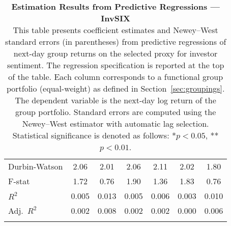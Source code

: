 \begin{table}[ht]
\begin{tabular}{l *{6}{c}}
Durbin-Watson & 2.06 & 2.01 & 2.06 & 2.11 & 2.02 & 1.80 \\
F-stat & 1.72 & 0.76 & 1.90 & 1.36 & 1.83 & 0.76 \\
\(R^2\) & 0.005 & 0.013 & 0.005 & 0.006 & 0.003 & 0.010 \\
Adj.\ \(R^2\) & 0.002 & 0.008 & 0.002 & 0.002 & 0.000 & 0.006 \\
\addlinespace
\midrule
\multicolumn{7}{c}{Specification tested: $R_{g,t+1} = \alpha_g + \beta_{sent,g} S_t + \phi R_{g,t} + \theta B_{g,t} + \gamma M_t + \varepsilon_{g,t+1}$}\\
\bottomrule
\end{tabular}
\caption{\textbf{Estimation Results from Predictive Regressions — InvSIX} \\
This table presents coefficient estimates and Newey--West standard errors (in parentheses) from predictive regressions of next-day group returns on the selected proxy for investor sentiment.
The regression specification is reported at the top of the table. Each column corresponds to a functional group portfolio (equal-weight) as defined in Section~\ref{sec:groupings}.
The dependent variable is the next-day log return of the group portfolio. Standard errors are computed using the Newey--West estimator with automatic lag selection. Statistical significance is denoted as follows: *$p<0.05$, **$p<0.01$.}
\label{tab:h2_invsix_results}
\end{table}